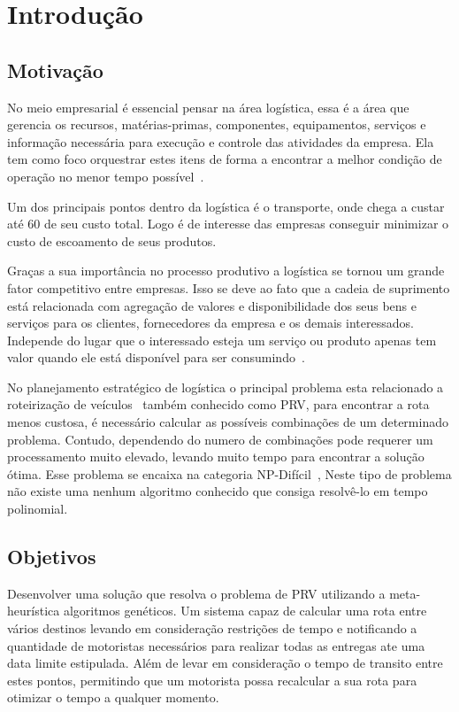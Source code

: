 
\chapter[Introdução]{Introdução}

\section{Motivação}

No meio empresarial é essencial pensar na área logística, essa é a área que gerencia os recursos,
matérias-primas, componentes, equipamentos, serviços e informação necessária para execução e 
controle das atividades da empresa. Ela tem como foco orquestrar estes itens de forma a encontrar
a melhor condição de operação no menor tempo possível~\cite{DIAS}.

Um dos principais pontos dentro da logística é o transporte, onde chega a custar até 60%
de seu custo total.\cite{RODRIGUES} Logo é de interesse das empresas conseguir minimizar o custo de escoamento de seus produtos.

Graças a sua importância no processo produtivo a logística se tornou um grande fator competitivo entre empresas.
Isso se deve ao fato que a cadeia de suprimento está relacionada com agregação de valores e disponibilidade dos seus bens e
serviços para os clientes, fornecedores da empresa e os demais interessados. Independe do lugar que o interessado esteja um serviço ou produto apenas tem valor quando 
ele está disponível para ser consumindo~\cite{TSUDA}.

No planejamento estratégico de logística o principal problema esta relacionado a roteirização de veículos~\cite{TSUDA} também conhecido como PRV, 
para encontrar a rota menos custosa, é necessário calcular as possíveis combinações de um determinado problema. Contudo, dependendo do numero de combinações pode requerer um
processamento muito elevado, levando muito tempo para encontrar a solução ótima. Esse problema se encaixa na categoria NP-Difícil~\cite{CUNHA}, Neste tipo de problema não existe
uma nenhum algoritmo conhecido que consiga resolvê-lo em tempo polinomial.

\section{Objetivos}

Desenvolver uma solução que resolva o problema de PRV utilizando a meta-heurística algoritmos genéticos. Um sistema capaz de calcular uma rota entre vários destinos 
levando em consideração restrições de tempo e notificando a quantidade de motoristas necessários para realizar todas as entregas ate uma data limite estipulada. Além de levar  
em consideração o tempo de transito entre estes pontos, permitindo que um motorista possa recalcular a sua rota para otimizar o tempo a qualquer momento.

